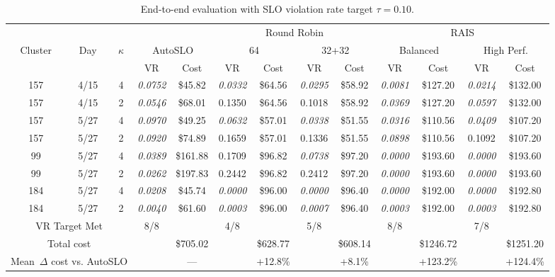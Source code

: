 \documentclass{article}
\begin{document}
\begin{table}[t]
\centering
\footnotesize
\setlength{\tabcolsep}{2.5pt}
\caption{End-to-end evaluation with SLO violation rate target $\tau=0.10$.}\label{tab:todo}
\begin{tabular}{c c c || c c | c c | c c | c c | c c}
\toprule
 &  &  &  &  & \multicolumn{4}{c|}{Round Robin} & \multicolumn{4}{c}{RAIS} \\
Cluster & Day & $\kappa$ & \multicolumn{2}{c|}{AutoSLO} & \multicolumn{2}{c|}{64} & \multicolumn{2}{c|}{32+32} & \multicolumn{2}{c|}{Balanced} & \multicolumn{2}{c}{High Perf.} \\
 &  &  & VR & Cost & VR & Cost & VR & Cost & VR & Cost & VR & Cost \\
\hline
157 & 4/15 & 4 & \textit{0.0752} & \$45.82 & \textit{0.0332} & \$64.56 & \textit{0.0295} & \$58.92 & \textit{0.0081} & \$127.20 & \textit{0.0214} & \$132.00 \\
157 & 4/15 & 2 & \textit{0.0546} & \$68.01 & 0.1350 & \$64.56 & 0.1018 & \$58.92 & \textit{0.0369} & \$127.20 & \textit{0.0597} & \$132.00 \\
157 & 5/27 & 4 & \textit{0.0970} & \$49.25 & \textit{0.0632} & \$57.01 & \textit{0.0338} & \$51.55 & \textit{0.0316} & \$110.56 & \textit{0.0409} & \$107.20 \\
157 & 5/27 & 2 & \textit{0.0920} & \$74.89 & 0.1659 & \$57.01 & 0.1336 & \$51.55 & \textit{0.0898} & \$110.56 & 0.1092 & \$107.20 \\
99 & 5/27 & 4 & \textit{0.0389} & \$161.88 & 0.1709 & \$96.82 & \textit{0.0738} & \$97.20 & \textit{0.0000} & \$193.60 & \textit{0.0000} & \$193.60 \\
99 & 5/27 & 2 & \textit{0.0262} & \$197.83 & 0.2442 & \$96.82 & 0.2412 & \$97.20 & \textit{0.0000} & \$193.60 & \textit{0.0000} & \$193.60 \\
184 & 5/27 & 4 & \textit{0.0208} & \$45.74 & \textit{0.0000} & \$96.00 & \textit{0.0000} & \$96.40 & \textit{0.0000} & \$192.00 & \textit{0.0000} & \$192.80 \\
184 & 5/27 & 2 & \textit{0.0040} & \$61.60 & \textit{0.0003} & \$96.00 & \textit{0.0007} & \$96.40 & \textit{0.0003} & \$192.00 & \textit{0.0003} & \$192.80 \\
\hline
\multicolumn{3}{c||}{VR Target Met} & 8/8 &  & 4/8 &  & 5/8 &  & 8/8 &  & 7/8 &  \\
\multicolumn{3}{c||}{Total cost} &  & \$705.02 &  & \$628.77 &  & \$608.14 &  & \$1246.72 &  & \$1251.20 \\
\multicolumn{3}{c||}{Mean~$\Delta$ cost vs. AutoSLO} &  & --- &  & +12.8\% &  & +8.1\% &  & +123.2\% &  & +124.4\% \\
\bottomrule
\end{tabular}
\end{table}
\end{document}
